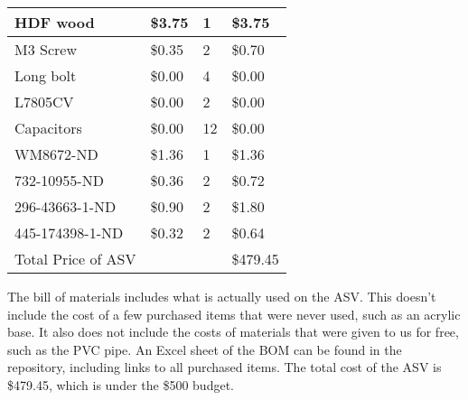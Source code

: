 \begin{table}[H]
\begin{tabular}{|l|l|l|l|}
        HDF wood & \$3.75 & 1 & \$3.75 \\ \hline
        M3 Screw & \$0.35 & 2 & \$0.70 \\ \hline
        Long bolt  & \$0.00 & 4 & \$0.00 \\ \hline
        L7805CV & \$0.00 & 2 & \$0.00 \\ \hline
        Capacitors & \$0.00 & 12 & \$0.00 \\ \hline
        WM8672-ND & \$1.36 & 1 & \$1.36 \\ \hline
        732-10955-ND & \$0.36 & 2 & \$0.72 \\ \hline
        296-43663-1-ND & \$0.90 & 2 & \$1.80 \\ \hline
        445-174398-1-ND & \$0.32 & 2 & \$0.64 \\ \hline
        Total Price of ASV & ~ & ~ & \$479.45 \\ \hline
    \end{tabular}
\end{table}

The bill of materials includes what is actually used on the ASV. This doesn't include the cost of a few purchased items that were never used, such as an acrylic base. It also does not include the costs of materials that were given to us for free, such as the PVC pipe. An Excel sheet of the BOM can be found in the repository, including links to all purchased items. The total cost of the ASV is \$479.45, which is under the \$500 budget.